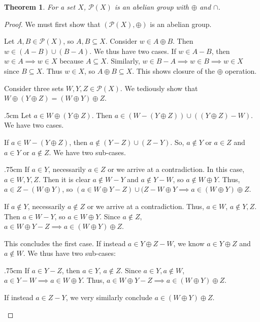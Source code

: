 \documentclass[10pt, letterpaper]{article}
\newcommand{\powerset}[1]{\mathcal{P}(#1)}
\newenvironment{tabOver}[1]
{\begin{adjustwidth}{#1cm}{}}{\end{adjustwidth}}
\newtheorem{theorem}{Theorem}
\theoremstyle{definition}
\begin{document}
\begin{theorem}
	For a set \(X\), \(\powerset{X}\) is an abelian group with $\oplus$ and $\cap$.
\end{theorem}
\begin{proof}
	We must first show that \((\powerset{X}, \oplus)\) is an abelian group.

	Let \(A,B\in\powerset{X}\), so \(A,B\subseteq X\). 
	Consider \(w\in A\oplus B\). Then \(w\in (A-B)\cup(B-A)\). 
	We thus have two cases. 
	If \(w\in A-B\), then \(w\in A\implies w\in X\) because \(A\subseteq X\). 
	Similarly, \(w\in B-A\implies w\in B\implies w\in X\) since \(B\subseteq X\). 
	Thus \(w\in X\), so \(A\oplus B\subseteq X\).
	This shows closure of the \(\oplus\) operation.

	Consider three sets \(W,Y,Z\in\powerset{X}\). 
	We tediously show that \(W\oplus(Y\oplus Z)=(W\oplus Y)\oplus Z\).

	\begin{tabOver}{.5}
		Let \(a\in W\oplus(Y\oplus Z)\). Then \(a\in (W-(Y\oplus Z))\cup((Y\oplus Z)-W)\).
		We have two cases. 

		If \(a\in W-(Y\oplus Z)\), then \(a\notin(Y-Z)\cup(Z-Y)\). 
		So, \(a\notin Y\text{ or }a\in Z\) and \(a\in Y\text{ or }a\notin Z\).
		We have two sub-cases.

		\begin{tabOver}{.75}
			If \(a\in Y\), necessarily \(a\in Z\) or we arrive at a contradiction. 
			In this case, \(a\in W,Y,Z\). Then it is clear \(a\notin W-Y\) and \(a\notin Y-W\),
			so \(a\notin W\oplus Y\). Thus, \(a\in Z-(W\oplus Y)\), 
			so \((a\in W\oplus Y-Z)\cup(Z-W\oplus Y\implies a\in (W\oplus Y)\oplus Z\).

			If \(a\notin Y\), necessarily \(a\notin Z\) or we arrive at a contradiction.
			Thus, \(a\in W\), \(a\notin Y,Z\). Then \(a\in W-Y\), so \(a\in W\oplus Y\).
			Since \(a\notin Z\), \(a\in W\oplus Y-Z\implies a\in (W\oplus Y)\oplus Z\).
		\end{tabOver}

		This concludes the first case. If instead \(a\in Y\oplus Z - W\),
		we know \(a\in Y\oplus Z\) and \(a\notin W\). We thus have two sub-cases:

		\begin{tabOver}{.75}
			If \(a\in Y-Z\), then \(a\in Y\), \(a\notin Z\).
			Since \(a\in Y, a\notin W\), \(a\in Y-W\implies a\in W\oplus Y\).
			Thus, \(a\in W\oplus Y-Z\implies a\in(W\oplus Y)\oplus Z\).

			If instead \(a\in Z-Y\), we very similarly conclude \(a\in (W\oplus Y)\oplus Z\).
		\end{tabOver}
	\end{tabOver}
	

\end{proof}
\end{document}
